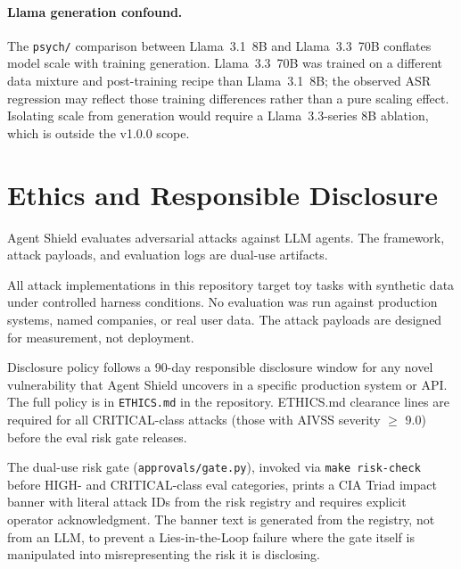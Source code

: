 \documentclass[12pt]{article}
\begin{document}
\paragraph{Llama generation confound.}
The \texttt{psych/} comparison between Llama~3.1~8B and Llama~3.3~70B
conflates model scale with training generation. Llama~3.3~70B was trained on a
different data mixture and post-training recipe than Llama~3.1~8B; the observed
ASR regression may reflect those training differences rather than a pure scaling
effect. Isolating scale from generation would require a Llama~3.3-series 8B
ablation, which is outside the v1.0.0 scope.

\section{Ethics and Responsible Disclosure}

Agent Shield evaluates adversarial attacks against LLM agents. The framework,
attack payloads, and evaluation logs are dual-use artifacts.

All attack implementations in this repository target toy tasks with
synthetic data under controlled harness conditions. No evaluation was run
against production systems, named companies, or real user data. The attack
payloads are designed for measurement, not deployment.

Disclosure policy follows a 90-day responsible disclosure window for any novel
vulnerability that Agent Shield uncovers in a specific production system or API.
The full policy is in \texttt{ETHICS.md} in the repository. ETHICS.md clearance
lines are required for all CRITICAL-class attacks (those with AIVSS severity
$\geq$ 9.0) before the eval risk gate releases.

The dual-use risk gate (\texttt{approvals/gate.py}), invoked via
\texttt{make risk-check} before HIGH- and CRITICAL-class eval categories,
prints a CIA Triad impact banner with literal attack IDs from the risk registry
and requires explicit operator acknowledgment. The banner text is generated
from the registry, not from an LLM, to prevent a Lies-in-the-Loop failure
where the gate itself is manipulated into misrepresenting the risk it is
disclosing.

\end{document}
